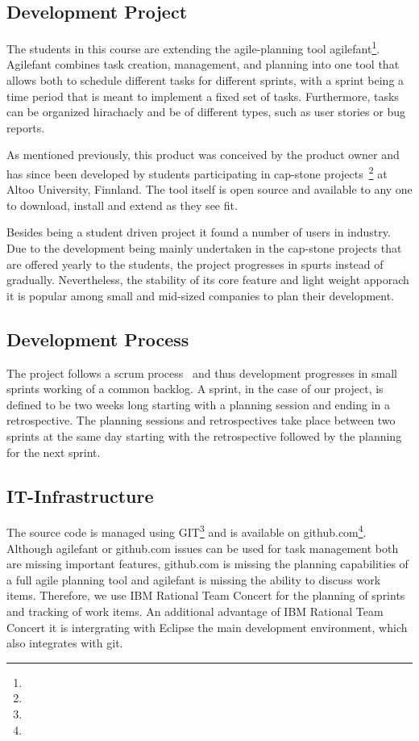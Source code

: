 \subsection{Development Project}
The students in this course are extending the agile-planning tool agilefant\footnote{}.
Agilefant combines task creation, management, and planning into one tool that allows both to schedule different tasks for different sprints, with a sprint being a time period that is meant to implement a fixed set of tasks.
Furthermore, tasks can be organized hirachacly and be of different types, such as user stories or bug reports.
 
As mentioned previously, this product was conceived by the product owner and has since been developed by students participating in cap-stone projects~\footnote{} at Altoo University, Finnland.
The tool itself is open source and available to any one to download, install and extend as they see fit.

Besides being a student driven project it found a number of users in industry.
Due to the development being mainly undertaken in the cap-stone projects that are offered yearly to the students, the project progresses in spurts instead of gradually.
Nevertheless, the stability of its core feature and light weight apporach it is popular among small and mid-sized companies to plan their development.

\subsection{Development Process}
The project follows a scrum process~\cite{} and thus development progresses in small sprints working of a common backlog.
A sprint, in the case of our project, is defined to be two weeks long starting with a planning session and ending in a retrospective.
The planning sessions and retrospectives take place between two sprints at the same day starting with the retrospective followed by the planning for the next sprint.

\subsection{IT-Infrastructure}
The source code is managed using GIT\footnote{} and is available on github.com\footnote{}.
Although agilefant or github.com issues can be used for task management both are missing important features, github.com is missing the planning capabilities of a full agile planning tool and agilefant is missing the ability to discuss work items.
Therefore, we use IBM Rational Team Concert for the planning of sprints and tracking of work items.
An additional advantage of IBM Rational Team Concert it is intergrating with Eclipse the main development environment, which also integrates with git. 

